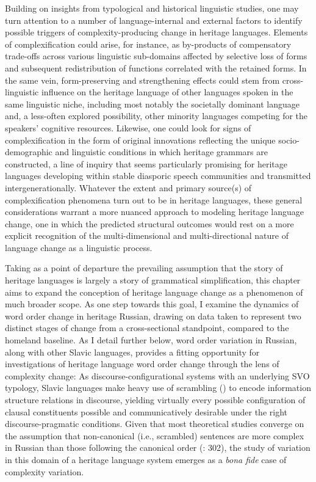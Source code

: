 \documentclass[output=paper]{langscibook}
\begin{document}
Building on insights from typological and historical linguistic studies, one may turn attention to a number of language-internal and external factors to identify possible triggers of complexity-producing change in heritage languages. Elements of complexification could arise, for instance, as by-products of compensatory trade-offs across various linguistic sub-domains affected by selective loss of forms and subsequent redistribution of functions correlated with the retained forms. In the same vein, form-preserving and strengthening effects could stem from cross-linguistic influence on the heritage language of other languages spoken in the same linguistic niche, including most notably the societally dominant language and, a less-often explored possibility, other minority languages competing for the speakers’ cognitive resources. Likewise, one could look for signs of complexification in the form of original innovations reflecting the unique socio-demographic and linguistic conditions in which heritage grammars are constructed, a line of inquiry that seems particularly promising for heritage languages developing within stable diasporic speech communities and transmitted intergenerationally. Whatever the extent and primary source(s) of complexification phenomena turn out to be in heritage languages, these general considerations warrant a more nuanced approach to modeling heritage language change, one in which the predicted structural outcomes would rest on a more explicit recognition of the multi-dimensional and multi-directional nature of language change as a linguistic process.

Taking as a point of departure the prevailing assumption that the story of heritage languages is largely a story of grammatical simplification, this chapter aims to expand the conception of heritage language change as a phenomenon of much broader scope. As one step towards this goal, I examine the dynamics of word order change in heritage Russian, drawing on data taken to represent two distinct stages of change from a cross-sectional standpoint, compared to the homeland baseline. As I detail further below, word order variation in Russian, along with other Slavic languages, provides a fitting opportunity for investigations of heritage language word order change through the lens of complexity change: As discourse-configurational systems with an underlying SVO typology, Slavic languages make heavy use of scrambling (\citealt{Ross1967}) to encode information structure relations in discourse, yielding virtually every possible configuration of clausal constituents possible and communicatively desirable under the right discourse-pragmatic conditions. Given that most theoretical studies converge on the assumption that non-canonical (i.e., scrambled) sentences are more complex in Russian than those following the canonical order (\citealt{Sekerina2003}: 302), the study of variation in this domain of a heritage language system emerges as a \textit{bona fide} case of complexity variation.
\end{document}
